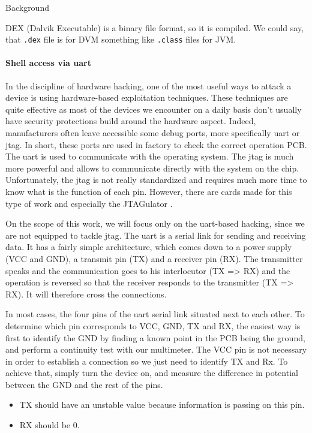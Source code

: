 \begin{chaptercover}{Background}
\begin{indentbox}{1cm}
DEX (Dalvik Executable) is a binary file format, so it is compiled. We could say, that \texttt{.dex} file is for DVM something like \texttt{.class} files for JVM.
\end{indentbox}

\paragraph{Shell access via \acrshort{uart}}\label{subsec:uart-jtag} In the discipline of hardware hacking, one of the most useful ways to attack a device is using hardware-based exploitation techniques. These techniques are quite effective as most of the devices we encounter on a daily basis don’t usually have security protections build around the hardware aspect. Indeed, manufacturers often leave accessible some debug ports, more specifically \acrfull{uart} or \acrfull{jtag}. In short, these ports are used in factory to check the correct operation PCB. The \acrshort{uart} is used to communicate with the operating system. The \acrshort{jtag} is much more powerful and allows to communicate directly with the system on the chip. Unfortunately, the \acrshort{jtag} is not really standardized and requires much more time to know what is the function of each pin. However, there are cards made for this type of work and especially the JTAGulator \cite{jtagulator}.

\begin{indentbox}{1cm}
On the scope of this work, we will focus only on the \acrshort{uart}-based hacking, since we are not equipped to tackle \acrshort{jtag}. The \acrshort{uart} is a serial link for sending and receiving data. It has a fairly simple architecture, which comes down to a power supply (VCC and GND), a transmit pin (TX) and a receiver pin (RX). The transmitter speaks and the communication goes to his interlocutor (TX => RX) and the operation is reversed so that the receiver responds to the transmitter (TX => RX). It will therefore cross the connections.

In most cases, the four pins of the \acrshort{uart} serial link situated next to each other. To determine which pin corresponds to VCC, GND, TX and RX, the easiest way is first to identify the GND by finding a known point in the PCB being the ground, and perform a continuity test with our multimeter. The VCC pin is not necessary in order to establish a connection so we just need to identify TX and Rx. To achieve that, simply turn the device on, and measure the difference in potential between the GND and the rest of the pins.
\begin{itemize}[itemsep=0.1cm,topsep=0.1cm]
  \item TX should have an unstable value because information is passing on this pin.
  \item RX should be 0.
\end{itemize}
\end{indentbox}


\end{chaptercover}
